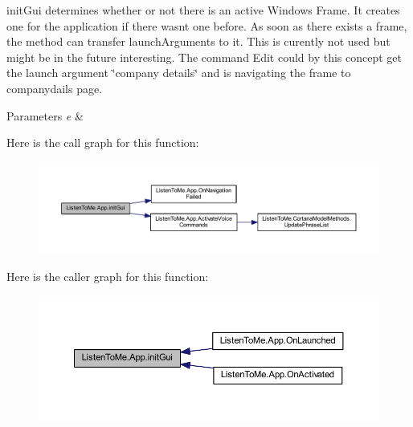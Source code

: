 init\+Gui determines whether or not there is an active Windows Frame. It creates one for the application if there wasn\textquotesingle{}t one before. As soon as there exists a frame, the method can transfer launch\+Arguments to it. This is curently not used but might be in the future interesting. The command Edit could by this concept get the launch argument \char`\"{}company details\char`\"{} and is navigating the frame to companydails page. 


\begin{DoxyParams}{Parameters}
{\em e} & \\
\hline
\end{DoxyParams}


Here is the call graph for this function\+:
\nopagebreak
\begin{figure}[H]
\begin{center}
\leavevmode
\includegraphics[width=350pt]{class_listen_to_me_1_1_app_ad23d27a2bdcd858e10e589bfadb1db17_cgraph}
\end{center}
\end{figure}




Here is the caller graph for this function\+:
\nopagebreak
\begin{figure}[H]
\begin{center}
\leavevmode
\includegraphics[width=350pt]{class_listen_to_me_1_1_app_ad23d27a2bdcd858e10e589bfadb1db17_icgraph}
\end{center}
\end{figure}


